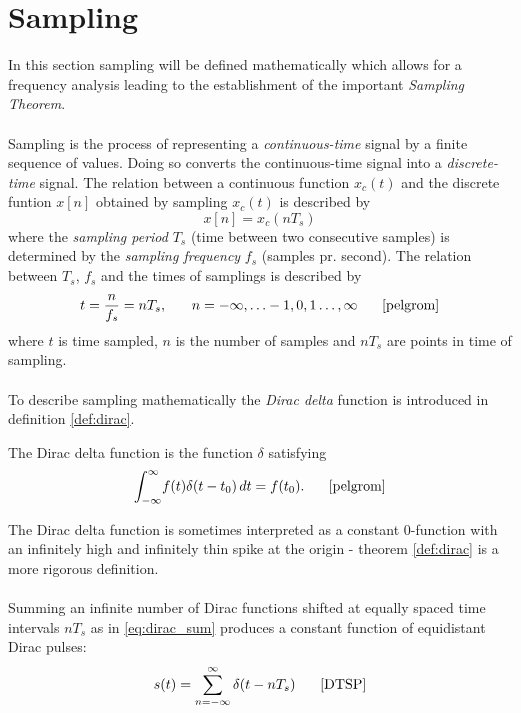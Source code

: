 \section{Sampling}\label{sec:sampling}
In this section sampling will be defined mathematically which allows for a frequency analysis leading to the establishment of the important \textit{Sampling Theorem}.\\\\
Sampling is the process of representing a \textit{continuous-time} signal by a finite sequence of values. Doing so converts the continuous-time signal into a \textit{discrete-time} signal. \cite{pelgrom} The relation between a continuous function $x_c(t)$ and the discrete funtion $x[n]$ obtained by sampling $x_c(t)$ is described by
\begin{equation}\label{eq:sampling_principle}
x[n]=x_c(nT_s)
\end{equation}
where the \textit{sampling period }$T_s$ (time between two consecutive samples) is determined by the \textit{sampling frequency} $f_s$ (samples pr. second). The relation between $T_s$, $f_s$ and the times of samplings is described by
\begin{equation}\label{eq:sample_freq}
t=\frac{n}{f_s}=nT_s, \phantom{mm} n=-\infty,\hdots-1,0,1\hdots,\infty \phantom{mm}\text{\cite{pelgrom}}
\end{equation}
where $t$ is time sampled, $n$ is the number of samples and $nT_s$ are points in time of sampling.\\\\
To describe sampling mathematically the \textit{Dirac delta} function is introduced in definition \ref{def:dirac}.
\begin{definition}\label{def:dirac}
The Dirac delta function is the function $\delta$ satisfying
\begin{equation}
\int_{-\infty}^{\infty} \! f(t)\delta(t-t_0) \, dt=f(t_0).\phantom{mm}\text{\cite{pelgrom}}
\end{equation}
\end{definition}
The Dirac delta function is sometimes interpreted as a constant 0-function with an infinitely high and infinitely thin spike at the origin - theorem \ref{def:dirac} is a more rigorous definition.
\\\\
Summing an infinite number of Dirac functions shifted at equally spaced time intervals $nT_s$ as in \eqref{eq:dirac_sum} produces a constant function of equidistant Dirac pulses:
\begin{equation}\label{eq:dirac_sum}
s(t)=\sum_{n=-\infty}^{\infty}\delta(t-nT_s)\phantom{mm}\text{\cite{DTSP}}
\end{equation}
